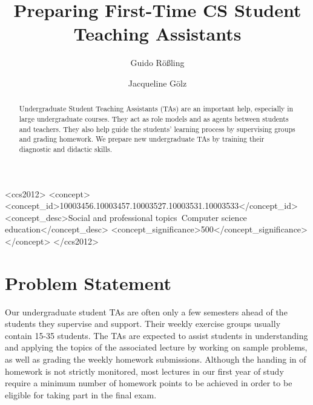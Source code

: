 \documentclass[sigconf,screen]{acmart}
\begin{document}

\title{Preparing First-Time CS Student Teaching Assistants}

\author{Guido R\"o\ss{}ling}
\author{Jacqueline G\"olz}
\begin{CCSXML}
<ccs2012>
<concept>
<concept_id>10003456.10003457.10003527.10003531.10003533</concept_id>
<concept_desc>Social and professional topics~Computer science education</concept_desc>
<concept_significance>500</concept_significance>
</concept>
</ccs2012>
\end{CCSXML}



\begin{abstract}
Undergraduate Student Teaching Assistants (TAs) are an important help, especially in large
undergraduate courses. They act as role models and as agents between students and teachers.
They also help guide the students' learning process by supervising groups and grading homework.
We prepare new undergraduate TAs by training their diagnostic and didactic skills.
\end{abstract}

\maketitle

\section{Problem Statement}

Our undergraduate student TAs are often only a few semesters ahead of the students
they supervise and support. Their weekly exercise groups usually contain 15-35 students. 
The TAs are expected to assist students in understanding and applying the topics of the associated lecture by
working on sample problems, as well as grading the weekly homework submissions. 
Although the handing in of homework is not strictly monitored, most lectures in our first year of
study require a minimum number of homework points to be achieved in order to be eligible
for taking part in the final exam.
\end{document}
